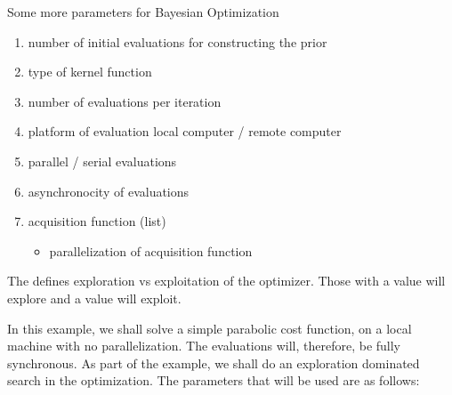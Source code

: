 \documentclass[letterpaper,12pt,english]{sphinxmanual}
\begin{document}
\sphinxAtStartPar
Some more parameters for Bayesian Optimization
\begin{enumerate}
%
\setcounter{enumi}{3}
\item {} 
\sphinxAtStartPar
number of initial evaluations for constructing the prior \textendash{}

\item {} 
\sphinxAtStartPar
type of kernel function \textendash{} 

\item {} 
\sphinxAtStartPar
number of evaluations per iteration \textendash{} 

\item {} 
\sphinxAtStartPar
platform of evaluation \sphinxhyphen{} local computer / remote computer

\item {} 
\sphinxAtStartPar
parallel / serial evaluations \textendash{} 

\item {} 
\sphinxAtStartPar
asynchronocity of evaluations \textendash{} 

\item {} 
\sphinxAtStartPar
acquisition function (list) \textendash{} 
\begin{itemize}
\item {} 
\sphinxAtStartPar
parallelization of acquisition function \textendash{} 

\end{itemize}

\end{enumerate}

\sphinxAtStartPar
The  defines exploration vs exploitation of the optimizer. Those with a   value
will explore and a   value will exploit.

\sphinxAtStartPar
In this example, we shall solve a simple parabolic cost function, on a local machine with no parallelization. The evaluations
will, therefore, be fully synchronous. As part of the example, we shall do an exploration dominated search in the
optimization. The parameters that will be used are as follows:
\end{document}
